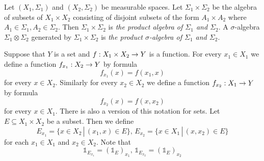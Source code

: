 \begin{definition}
    Let $(X_1,\Sigma_1)$ and $(X_2,\Sigma_2)$ be measurable spaces. Let $\Sigma_1\times \Sigma_2$ be the algebra of subsets of $X_1\times X_2$ consisting of disjoint subsets of the form $A_1\times A_2$ where $A_1 \in \Sigma_1,A_2\in \Sigma_2$. Then $\Sigma_1\times \Sigma_2$ is \textit{the product algebra of $\Sigma_1$ and $\Sigma_2$}. A $\sigma$-algebra $\Sigma_1\otimes \Sigma_2$ generated by $\Sigma_1\times \Sigma_2$ is \textit{the product $\sigma$-algebra of $\Sigma_1$ and $\Sigma_2$}.
\end{definition}
\noindent
Suppose that $Y$ is a set and $f:X_1\times X_2\rightarrow Y$ is a function. For every $x_1\in X_1$ we define a function $f_{x_1}:X_2\rightarrow Y$ by formula
$$f_{x_1}(x) = f(x_1,x)$$
for every $x \in X_2$. Similarly for every $x_2\in X_2$ we define a function $f_{x_2}:X_1\rightarrow Y$ by formula
$$f_{x_2}(x) = f(x,x_2)$$
for every $x \in X_1$. There is also a version of this notation for sets. Let $E\subseteq X_1\times X_2$ be a subset. Then we define
$$E_{x_1} = \{x\in X_2\,|\,(x_1,x)\in E\},\,E_{x_2} = \{x\in X_1\,|\,(x,x_2)\in E\}$$
for each $x_1\in X_1$ and $x_2\in X_2$. Note that
$$\mathbb{1}_{E_{x_1}} = \left(\mathbb{1}_E\right)_{x_1},\,\mathbb{1}_{E_{x_2}} = \left(\mathbb{1}_E\right)_{x_2}$$

